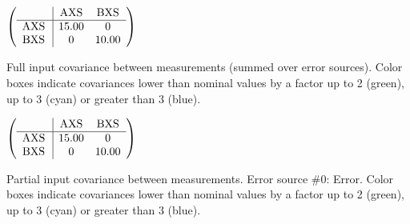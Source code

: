 \begin{table}[H]
\scriptsize
\begin{center}
\renewcommand{\arraystretch}{1.1}
\begin{math}\left(\begin{array}{c|cc}
 & \mathrm{AXS} & 
\mathrm{BXS} \\
\hline
\mathrm{AXS} \hspace*{2pt} &      15.00 &  0 \\
\mathrm{BXS} \hspace*{2pt} &  0 &      10.00 \\
\end{array}\right)\end{math}
\caption{Full input covariance between measurements (summed over error sources). Color boxes indicate covariances lower than nominal values by a factor up to 2 (green), up to 3 (cyan) or greater than 3 (blue).}
\renewcommand{\arraystretch}{1}
\end{center}
\end{table}
\begin{table}[H]
\scriptsize
\begin{center}
\renewcommand{\arraystretch}{1.1}
\begin{math}\left(\begin{array}{c|cc}
 & \mathrm{AXS} & 
\mathrm{BXS} \\
\hline
\mathrm{AXS} \hspace*{2pt} &      15.00 &  0 \\
\mathrm{BXS} \hspace*{2pt} &  0 &      10.00 \\
\end{array}\right)\end{math}
\caption{Partial input covariance between measurements. Error source \#0: Error. Color boxes indicate covariances lower than nominal values by a factor up to 2 (green), up to 3 (cyan) or greater than 3 (blue).}
\renewcommand{\arraystretch}{1}
\end{center}
\end{table}
\clearpage
